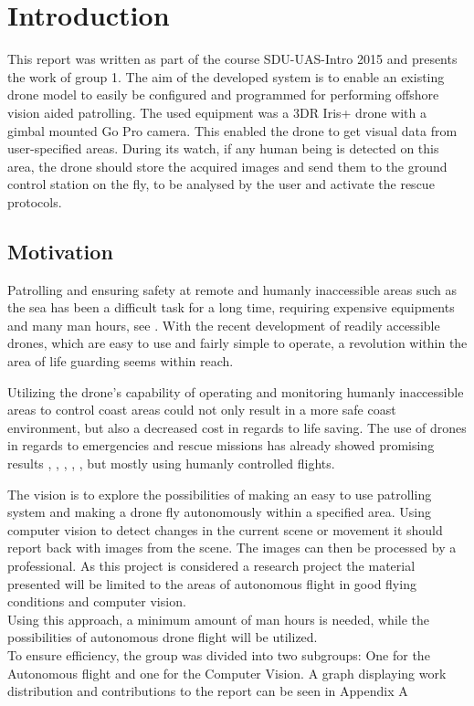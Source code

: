 \chapter*{Introduction}
This report was written as part of the course SDU-UAS-Intro 2015 and presents the work of group 1. 
The aim of the developed system is to enable an existing drone model to easily be configured and
programmed for performing offshore vision aided patrolling. 
The used equipment was a 3DR Iris+ drone with a gimbal mounted Go Pro camera.
This enabled the drone to get visual data from %
user-specified areas. %
During its watch, if any human being is detected on this area, the drone should store the acquired images and send
them to the ground control station on the fly, to be analysed by the user and activate the rescue protocols.

\section*{Motivation}
Patrolling and ensuring safety at remote and humanly inaccessible areas such as the sea has 
been a difficult task for a long time, requiring expensive equipments and many man hours,
see \cite{Ref:Drone2}.
With the recent development of readily accessible drones, which are easy to use and fairly simple to operate,
a revolution within the area of life guarding seems within reach. 

Utilizing the drone's capability of operating and monitoring humanly inaccessible areas to control coast areas
could not only result in a more safe coast environment, but also a decreased cost in regards to life saving.
The use of drones in regards to emergencies and rescue missions has already showed promising results
\cite{Ref:Drone1}, \cite{Ref:Drone3}, \cite{Ref:Drone4}, \cite{Ref:DroneResearch1}, \cite{Ref:DroneResearch1},
but mostly using humanly controlled flights.

The vision is to explore the possibilities of making an easy to use patrolling system
and making a drone fly autonomously within a specified area.
Using computer vision to detect changes in the current scene or movement it should report back with images from the scene.
The images can then be processed by a professional. As this project is considered a research project the material presented
will be limited to the areas of autonomous flight in good flying conditions and computer vision.
\\ 
Using this approach, a minimum amount of man hours is needed, while the possibilities of autonomous drone flight will be utilized.
\\
To ensure efficiency, the group was divided into two subgroups: One for the Autonomous flight and one for the Computer Vision.
A graph displaying work distribution and contributions to the report can be seen in Appendix A

